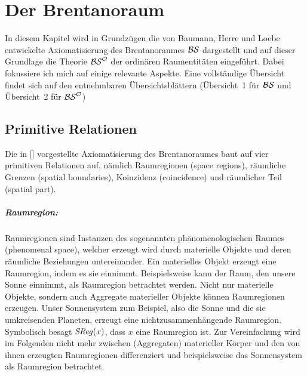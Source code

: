 \chapter{Der Brentanoraum}\label{chap:bs}

In diesem Kapitel wird in Grundzügen die von Baumann, Herre und Loebe entwickelte Axiomatisierung des Brentanoraumes $\mathcal{BS}$ dargestellt und auf dieser Grundlage die Theorie $\mathcal{BS}^{\mathcal{O}}$ der ordinären Raumentitäten eingeführt.
Dabei fokussiere ich mich auf einige relevante Aspekte.
Eine vollständige Übersicht findet sich auf den entnehmbaren Übersichtsblättern (Übersicht~1 für $\mathcal{BS}$ und Übersicht~2 für $\mathcal{BS}^{\mathcal{O}}$) 


\section{Primitive Relationen}
Die in [\cite{baumann-r-2016-53-a}] vorgestellte Axiomatisierung des Brentanoraumes baut auf vier primitiven Relationen auf, nämlich Raumregionen (space regions), räumliche Grenzen (spatial boundaries), Koinzidenz (coincidence) und räumlicher Teil (spatial part). 



\paragraph{Raumregion:}
       Raumregionen
       sind Instanzen des sogenannten phänomenologischen Raumes (phenomenal space), welcher erzeugt wird durch materielle Objekte und deren räumliche Beziehungen untereinander.
       Ein materielles Objekt erzeugt eine Raumregion, indem es sie einnimmt. 
       Beispielsweise kann der Raum, den unsere Sonne einnimmt, als Raumregion betrachtet werden.
       Nicht nur materielle Objekte, sondern auch Aggregate materieller Objekte können Raumregionen erzeugen.
       Unser Sonnensystem zum Beispiel, also die Sonne und die sie umkreisenden Planeten, erzeugt
       eine nichtzusammenhängende Raumregion.
       Symbolisch besagt $\mathit{S\hspace*{-0.25ex}Reg}(x)$, dass $x$ eine Raumregion ist.
       Zur Vereinfachung wird im Folgenden nicht mehr zwischen (Aggregaten) materieller Körper und  den von ihnen erzeugten Raumregionen differenziert und beispielsweise das Sonnensystem als Raumregion betrachtet.
   
